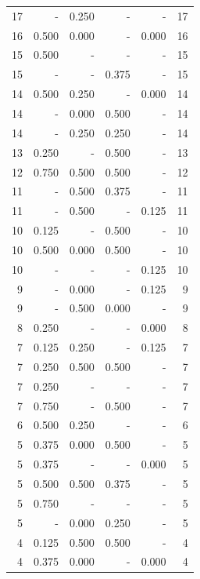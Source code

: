 \documentclass[a4paper]{article}\usepackage[]{graphicx}\usepackage[]{color}
\begin{document}
\begin{table}[ht]
\begin{tabular}{rrrrrr}
  17 & - & 0.250 & - & - & 17 \\ 
  16 & 0.500 & 0.000 & - & 0.000 & 16 \\ 
   \rowcolor{nullColor} 15 & 0.500 & - & - & - & 15 \\ 
   \rowcolor{sosoColor} 15 & - & - & 0.375 & - & 15 \\ 
  14 & 0.500 & 0.250 & - & 0.000 & 14 \\ 
   \rowcolor{badColor} 14 & - & 0.000 & 0.500 & - & 14 \\ 
   \rowcolor{goodColor} 14 & - & 0.250 & 0.250 & - & 14 \\ 
   \rowcolor{sosoColor} 13 & 0.250 & - & 0.500 & - & 13 \\ 
   \rowcolor{goodColor} 12 & 0.750 & 0.500 & 0.500 & - & 12 \\ 
  11 & - & 0.500 & 0.375 & - & 11 \\ 
  11 & - & 0.500 & - & 0.125 & 11 \\ 
   \rowcolor{sosoColor} 10 & 0.125 & - & 0.500 & - & 10 \\ 
   \rowcolor{badColor} 10 & 0.500 & 0.000 & 0.500 & - & 10 \\ 
   \rowcolor{nullColor} 10 & - & - & - & 0.125 & 10 \\ 
  9 & - & 0.000 & - & 0.125 & 9 \\ 
   \rowcolor{badColor} 9 & - & 0.500 & 0.000 & - & 9 \\ 
   \rowcolor{nullColor} 8 & 0.250 & - & - & 0.000 & 8 \\ 
  7 & 0.125 & 0.250 & - & 0.125 & 7 \\ 
   \rowcolor{goodColor} 7 & 0.250 & 0.500 & 0.500 & - & 7 \\ 
   \rowcolor{nullColor} 7 & 0.250 & - & - & - & 7 \\ 
   \rowcolor{sosoColor} 7 & 0.750 & - & 0.500 & - & 7 \\ 
  6 & 0.500 & 0.250 & - & - & 6 \\ 
   \rowcolor{badColor} 5 & 0.375 & 0.000 & 0.500 & - & 5 \\ 
   \rowcolor{nullColor} 5 & 0.375 & - & - & 0.000 & 5 \\ 
  5 & 0.500 & 0.500 & 0.375 & - & 5 \\ 
   \rowcolor{nullColor} 5 & 0.750 & - & - & - & 5 \\ 
   \rowcolor{badColor} 5 & - & 0.000 & 0.250 & - & 5 \\ 
   \rowcolor{goodColor} 4 & 0.125 & 0.500 & 0.500 & - & 4 \\ 
  4 & 0.375 & 0.000 & - & 0.000 & 4 \\ 

\end{tabular}
\end{table}
\end{document}
